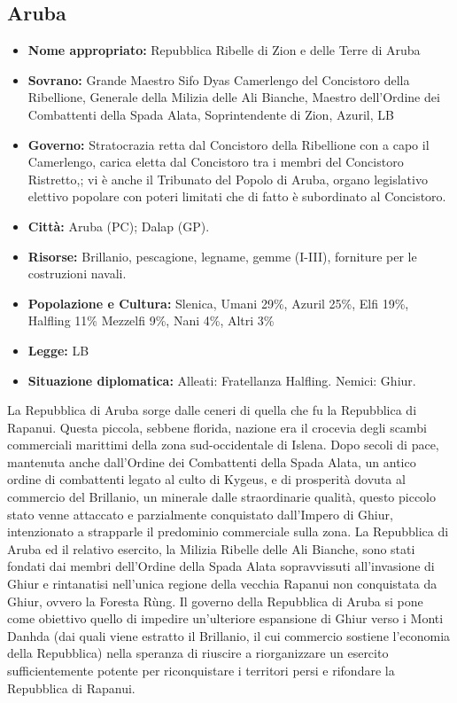 \documentclass[a4paper]{report}
\begin{document}
\begin{multicols}{2}
\subsection*{Aruba}
\begin{itemize}
	\item \textbf{Nome appropriato:} Repubblica Ribelle di Zion e delle Terre di Aruba
	\item \textbf{Sovrano:} Grande Maestro Sifo Dyas Camerlengo del Concistoro della Ribellione, Generale della Milizia delle Ali Bianche, Maestro dell’Ordine dei Combattenti della Spada Alata, Soprintendente di Zion, Azuril, LB
	\item \textbf{Governo:} Stratocrazia retta dal Concistoro della Ribellione con a capo il Camerlengo, carica eletta dal Concistoro tra i membri del Concistoro Ristretto,; vi è anche il Tribunato del Popolo di Aruba, organo legislativo elettivo popolare con poteri limitati che di fatto è subordinato al Concistoro.
	\item \textbf{Città:} Aruba (PC); Dalap (GP).
	\item \textbf{Risorse:} Brillanio, pescagione, legname, gemme (I-III), forniture per le costruzioni navali.
	\item \textbf{Popolazione e Cultura:} Slenica, Umani 29\%, Azuril 25\%, Elfi 19\%, Halfling 11\% Mezzelfi 9\%, Nani 4\%, Altri 3\%
	\item \textbf{Legge:} LB
	\item \textbf{Situazione diplomatica:} Alleati: Fratellanza Halfling.
	Nemici: Ghiur.
\end{itemize}
La Repubblica di Aruba sorge dalle ceneri di quella che fu la Repubblica di Rapanui. Questa piccola, sebbene florida, nazione era il crocevia degli scambi commerciali marittimi della zona sud-occidentale di Islena. Dopo secoli di pace, mantenuta anche dall’Ordine dei Combattenti della Spada Alata, un antico ordine di combattenti legato al culto di Kygeus, e di prosperità dovuta al commercio del Brillanio, un minerale dalle straordinarie qualità, questo piccolo stato venne attaccato e parzialmente conquistato dall’Impero di Ghiur, intenzionato a strapparle il predominio commerciale sulla zona. La Repubblica di Aruba ed il relativo esercito, la Milizia Ribelle delle Ali Bianche, sono stati fondati dai membri dell’Ordine della Spada Alata sopravvissuti all’invasione di Ghiur e rintanatisi nell’unica regione della vecchia Rapanui non conquistata da Ghiur, ovvero la Foresta Rùng.
Il governo della Repubblica di Aruba si pone come obiettivo quello di impedire un’ulteriore espansione di Ghiur verso i Monti Danhda (dai quali viene estratto il Brillanio, il cui commercio sostiene l’economia della Repubblica) nella speranza di riuscire a riorganizzare un esercito sufficientemente potente per riconquistare i territori persi e rifondare la Repubblica di Rapanui.



\end{multicols}
\end{document}
